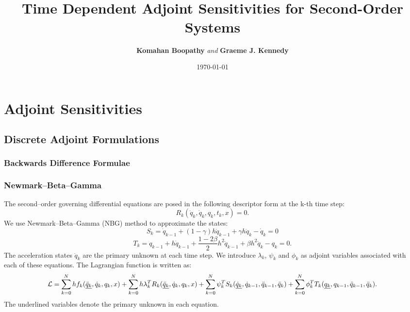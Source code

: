 \documentclass[10pt,letter]{book}
\title{\LARGE \textbf{Time Dependent Adjoint Sensitivities for Second-Order Systems}}
\author{\textbf{Komahan Boopathy} \textit{and} \textbf{Graeme J. Kennedy}}
\date{\today}
\begin{document}
\maketitle


\part{Adjoint Sensitivities}

\chapter{Discrete Adjoint Formulations}

\section{Backwards Difference Formulae}

\section{Newmark--Beta--Gamma}

The second--order governing differential equations are posed in the following
descriptor form at the k-th time step:
$$ R_k(\ddot{q}_k, \dot{q}_k, q_k, t_k , x) = 0.$$
We use Newmark--Beta--Gamma (NBG) method to approximate the states:
$$ S_k =  \dot{q}_{k-1}  + (1-\gamma) h \ddot{q}_{k-1} +  \gamma h \ddot{q}_{k}- \dot{q}_k=0$$ 
$$ T_k = {q}_{k-1} + h \dot{q}_{k-1} +\frac{1-2\beta}{2}
h^2\ddot{q}_{k-1}+ \beta h^2 \ddot{q}_k-{q}_k=0.$$ The acceleration
states $\ddot{q}_k$ are the primary unknown at each time step. We
introduce $\lambda_k$, $\psi_k$ and $\phi_k$ as adjoint variables
associated with each of these equations. The Lagrangian function is
written as:
$${\cal{L}} = \sum_{k=0}^N h f_k(\underline{\ddot{q}_k},
\dot{q}_k, q_k, x) + \sum_{k=0}^N h \lambda_k^T
R_k(\underline{\ddot{q}_k}, \dot{q}_k, q_k, x) + \sum_{k=0}^N \psi_k^T
S_k(\underline{\dot{q}_k}, \dot{q}_{k-1}, \ddot{q}_{k-1},
\ddot{q}_{k}) + \sum_{k=0}^N \phi_k^T T_k(\underline{{q}_k},
     {q}_{k-1}, \ddot{q}_{k-1}, \ddot{q}_{k}). $$     
     The underlined variables denote the primary unknown in each equation. 
\end{document}
